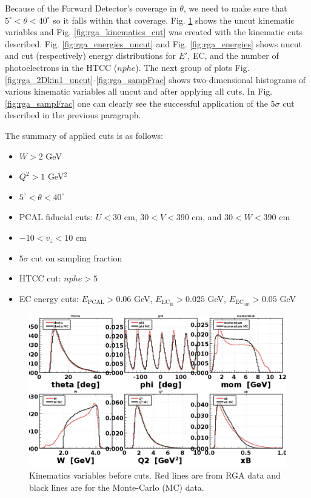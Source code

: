 Because of the Forward Detector's coverage in $\theta$, we need to make sure that $5^{\circ} < \theta < 40^{\circ}$ so it falls within that coverage. Fig. \ref{fig:rga_kinematics_uncut} shows the uncut kinematic variables and Fig. \ref{fig:rga_kinematics_cut} was created with the kinematic cuts described. Fig. \ref{fig:rga_energies_uncut} and Fig. \ref{fig:rga_energies} shows uncut and cut (respectively) energy distributions for $E'$, EC, and the number of photoelectrons in the HTCC ($nphe$). The next group of plots Fig. \ref{fig:rga_2Dkin1_uncut}-\ref{fig:rga_sampFrac} shows two-dimensional histograms of various kinematic variables all uncut and after applying all cuts. In Fig. \ref{fig:rga_sampFrac} one can clearly see the successful application of the $5\sigma$ cut described in the previous paragraph.

The summary of applied cuts is as follows:
\begin{itemize}
	\item $W>2$ GeV
	\item $Q^2>1$ GeV$^2$
	\item $5^{\circ} < \theta < 40^{\circ}$
	\item PCAL fiducial cuts: $U<30$ cm, $30<V<390$ cm, and $30<W<390$ cm
	\item $-10<v_z<10$ cm
	\item $5\sigma$ cut on sampling fraction
	\item HTCC cut: $nphe > 5$
	\item EC energy cuts: $E_{\mathrm{PCAL}} > 0.06$ GeV, $E_{\mathrm{EC_{in}}} > 0.025$ GeV, $E_{\mathrm{EC_{out}}} > 0.05$ GeV
\end{itemize}

\begin{figure}[h!]
	\centering
	\includegraphics[width=0.9\linewidth]{figures/rga/uncut/kinematics.png}
	\caption{Kinematics variables before cuts. Red lines are from RGA data and black lines are for the Monte-Carlo (MC) data.}
	\label{fig:rga_kinematics_uncut}
\end{figure}

